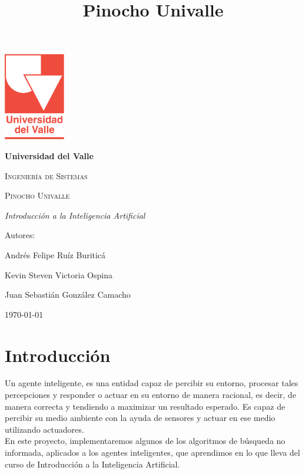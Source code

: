 \documentclass[12pt]{article}
\title{Pinocho Univalle}
\begin{document}
\begin{titlepage}
\centering
{\includegraphics[width=0.2\textwidth]{images/logo.png}\par}
\vspace{1cm}
{\bfseries\LARGE Universidad del Valle \par}
\vspace{1cm}
{\scshape\Large Ingeniería de Sistemas \par}
\vfill
{\scshape\Huge Pinocho Univalle \par}
\vfill
{\itshape\Large Introducción a la Inteligencia Artificial \par}
\vfill
{\Large Autores: \par}
{\Large Andrés Felipe Ruíz Buriticá \par}
{\Large Kevin Steven Victoria Ospina \par}
{\Large Juan Sebastián González Camacho \par}
\vfill
{\Large \today \par}
\end{titlepage}
\tableofcontents
\clearpage
\section{Introducción}
Un agente inteligente, es una entidad capaz de percibir su entorno, procesar tales percepciones y responder o actuar en su entorno de manera racional, es decir, de manera correcta y tendiendo a maximizar un resultado esperado. Es capaz de percibir su medio ambiente con la ayuda de sensores y actuar en ese medio utilizando actuadores.
\newline \\
En este proyecto, implementaremos algunos de los algoritmos de búsqueda no informada, aplicados a los agentes inteligentes, que aprendimos en lo que lleva del curso de Introducción a la Inteligencia Artificial.
\clearpage
\end{document}
